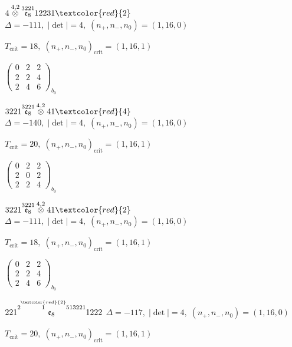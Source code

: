 \documentclass[10pt]{article}
\begin{document}
$4\overset{4,2}{\otimes}\overset{3221}{\mathfrak{e}_8}12231\textcolor{red}{2}$ \quad $\Delta=-111,\; |\det|=4,\; (n_+,n_-,n_0)=(1,16,0)$

\hspace{1em}$T_{\text{crit}}=18,\; (n_+,n_-,n_0)_{\text{crit}}=(1,16,1)$

\hspace{2em}$\left(\begin{smallmatrix}0 & 2 & 2 \\ 2 & 2 & 4 \\ 2 & 4 & 6\end{smallmatrix}\right)_{\!b_0}$

\smallskip

$3221\overset{3221}{\mathfrak{e}_8}\overset{4,2}{\otimes}41\textcolor{red}{4}$ \quad $\Delta=-140,\; |\det|=4,\; (n_+,n_-,n_0)=(1,16,0)$

\hspace{1em}$T_{\text{crit}}=20,\; (n_+,n_-,n_0)_{\text{crit}}=(1,16,1)$

\hspace{2em}$\left(\begin{smallmatrix}0 & 2 & 2 \\ 2 & 0 & 2 \\ 2 & 2 & 4\end{smallmatrix}\right)_{\!b_0}$

$3221\overset{3221}{\mathfrak{e}_8}\overset{4,2}{\otimes}41\textcolor{red}{2}$ \quad $\Delta=-111,\; |\det|=4,\; (n_+,n_-,n_0)=(1,16,0)$

\hspace{1em}$T_{\text{crit}}=18,\; (n_+,n_-,n_0)_{\text{crit}}=(1,16,1)$

\hspace{2em}$\left(\begin{smallmatrix}0 & 2 & 2 \\ 2 & 2 & 4 \\ 2 & 4 & 6\end{smallmatrix}\right)_{\!b_0}$

\smallskip

$221\overset{2\overset{\textcolor{red}{2}}{1}513221}{\mathfrak{e}_8}1222$ \quad $\Delta=-117,\; |\det|=4,\; (n_+,n_-,n_0)=(1,16,0)$

\hspace{1em}$T_{\text{crit}}=20,\; (n_+,n_-,n_0)_{\text{crit}}=(1,16,1)$
\end{document}
